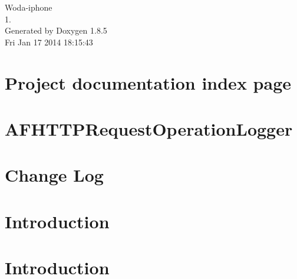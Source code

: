 \documentclass[twoside]{book}
\newcommand{\clearemptydoublepage}{%
  \newpage{\pagestyle{empty}\cleardoublepage}%
}
\begin{document}
\hypersetup{pageanchor=false}
\begin{titlepage}
\vspace*{7cm}
\begin{center}%
{\Large Woda-\/iphone \\[1ex]\large 1. }\\
\vspace*{1cm}
{\large Generated by Doxygen 1.8.5}\\
\vspace*{0.5cm}
{\small Fri Jan 17 2014 18:15:43}\\
\end{center}
\end{titlepage}
\clearemptydoublepage
\tableofcontents
\clearemptydoublepage
{}
\hypersetup{pageanchor=true}

\chapter{Project documentation index page}
\label{index}\hypertarget{index}{}
\chapter{A\-F\-H\-T\-T\-P\-Request\-Operation\-Logger}
\label{md__sources__librairies__a_f_h_t_t_p_request_operation_logger__r_e_a_d_m_e}
\hypertarget{md__sources__librairies__a_f_h_t_t_p_request_operation_logger__r_e_a_d_m_e}{}

\chapter{Change Log}
\label{md__sources__librairies_appirater__c_h_a_n_g_e_l_o_g}
\hypertarget{md__sources__librairies_appirater__c_h_a_n_g_e_l_o_g}{}

\chapter{Introduction}
\label{md__sources__librairies_appirater__r_e_a_d_m_e}
\hypertarget{md__sources__librairies_appirater__r_e_a_d_m_e}{}

\chapter{Introduction}
\label{md__sources__librairies__test_flight_s_d_k__r_e_a_d_m_e}
\hypertarget{md__sources__librairies__test_flight_s_d_k__r_e_a_d_m_e}{}

\end{document}
